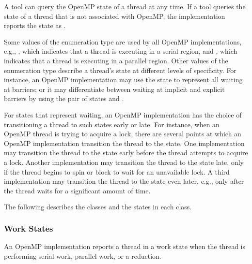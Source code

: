 A tool can query the OpenMP state of a thread at any time. 
If a tool queries the state of a thread that is not associated 
with OpenMP, the implementation reports the state as .

\begin{comment}
For each OpenMP thread the runtime maintains not only a state but also an \code{ompt\_wait\_id\_t}
identifier.  When a thread is waiting for a lock, critical region,
ordered, or atomic, and the thread is in a wait
state, then 
the thread's \code{wait\_id} field identifies the lock, critical construct, ordered construct, atomic construct, or internal variable
upon which the
thread is waiting. The semantics of the values used for a \code{wait\_id} are implementation defined.
A thread's \code{wait\_id} is undefined if the thread
is not in a wait state.
\end{comment}

Some values of the enumeration type  are used by all 
OpenMP implementations, 
e.g., , 
which indicates that a thread is executing in a serial region, and  
, 
which indicates that a thread is executing in a parallel region.
Other values of the enumeration type describe a thread's state at 
different levels of specificity. 
For instance, an OpenMP implementation may use 
the state   to represent all 
waiting at barriers; or it may differentiate between waiting at 
implicit and explicit barriers by using the pair of states
 and 
. 

For states that represent waiting, an OpenMP implementation has the 
choice of transitioning a thread to such states early or late.
For instance, when an OpenMP thread is trying to acquire a lock,
there are several points at which an OpenMP implementation
transition the thread to the  state.
One implementation may transition the thread to the state 
early before the thread attempts to acquire a
lock. Another implementation may transition the thread to the state 
late, only if the thread begins to spin or
block to wait for an unavailable lock. A third implementation
may transition the thread to the state even later, e.g., only
after the thread waits for a significant amount of time. 

The following describes the classes and the states in each class.
\subsubsection{Work States}
An OpenMP implementation reports a thread in a work state 
when the thread is performing serial work, parallel work, or a reduction.

